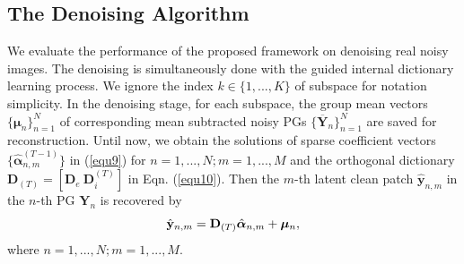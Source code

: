 \documentclass[10pt,twocolumn,letterpaper]{article}
\begin{document}
\subsection{The Denoising Algorithm}

We evaluate the performance of the proposed framework on denoising real noisy images. The denoising is simultaneously done with the guided internal dictionary learning process. We ignore the index $k\in\{1,...,K\}$ of subspace for notation simplicity. In the denoising stage, for each subspace, the group mean vectors $\{\bm{\mu}_{n}\}_{n=1}^{N}$ of corresponding mean subtracted noisy PGs $\{\mathbf{\overline{Y}}_{n}\}_{n=1}^{N}$ are saved for reconstruction. Until now, we obtain the solutions of sparse coefficient vectors $\{\hat{\bm{\alpha}}_{n,m}^{(T-1)}\}$ in (\ref{equ9}) for $n=1,...,N;m=1,...,M$ and the orthogonal dictionary $\mathbf{D}_{(T)} = [\mathbf{D}_{e}\ \mathbf{D}_{i}^{(T)}]$ in Eqn. (\ref{equ10}). Then the $m$-th latent clean patch $\hat{\mathbf{y}}_{n,m}$ in the $n$-th PG $\mathbf{Y}_{n}$ is recovered by 
\vspace{-2mm}
\begin{equation}\label{equ12}\vspace{-2mm}
\hat{\mathbf{y}}_{n,m}=\mathbf{D}_{(T)}\hat{\bm{\alpha}}_{n,m}+\bm{\mu}_{n},
\end{equation}
where $n=1,...,N;m=1,...,M$.
\end{document}
